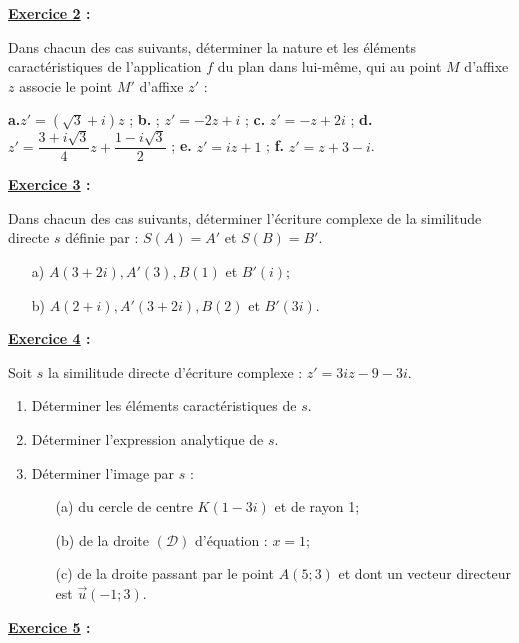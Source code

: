 \documentclass[12pt,a4paper]{article}
\begin{document}
\textbf{\underline{Exercice 2} :}

\bigskip

Dans chacun des cas suivants, déterminer la nature et les éléments caractéristiques de l’application \( f \) du plan dans lui-même, qui au point \( M \) d’affixe \( z \) associe le point \( M' \) d’affixe \( z' \) :

\textbf{a.}\( z' = (\sqrt{3} + i)z \) ; \textbf{b.} ; \( z' = -2z + i \) ; \textbf{c.} \( z' = -z + 2i \) ; \textbf{d.} \( z' = \dfrac{3 + i\sqrt{3}}{4}z + \dfrac{1 - i\sqrt{3}}{2} \) ; \textbf{e.} \( z' = iz + 1 \) ; \textbf{f.} \( z' = z + 3 - i \).

\textbf{\underline{Exercice 3} :}

\bigskip

Dans chacun des cas suivants, déterminer l’écriture complexe de la similitude directe \( s \) définie par :  
\( S(A) = A' \) et \( S(B) = B' \).

\begin{itemize}
    \item[a)] \( A(3+2i), A'(3), B(1) \) et \( B'(i) \);
    \item[b)] \( A(2+i), A'(3+2i), B(2) \) et \( B'(3i) \).
\end{itemize}

\bigskip

\textbf{\underline{Exercice 4} :}

\bigskip

Soit \( s \) la similitude directe d’écriture complexe :  \( z' = 3iz - 9 - 3i. \)

\begin{enumerate}
    \item Déterminer les éléments caractéristiques de \( s \).
    \item Déterminer l’expression analytique de \( s \).
    \item Déterminer l’image par \( s \) :
    \begin{enumerate}
        \item[(a)] du cercle de centre \( K(1 - 3i) \) et de rayon 1;
        \item[(b)] de la droite \( (\mathscr{D}) \) d’équation : \( x = 1 \);
        \item[(c)] de la droite passant par le point \( A(5;3) \) et dont un vecteur directeur est \( \vec{u}(-1;3) \).
    \end{enumerate}
\end{enumerate}

\textbf{\underline{Exercice 5} :}
\end{document}
